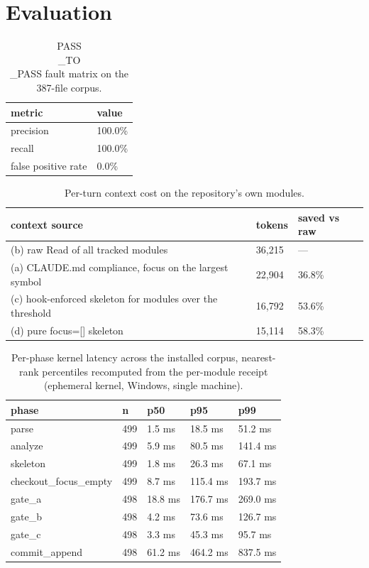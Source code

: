 \documentclass{article}
\begin{document}
\section{Evaluation}
\begin{table}[h]
\centering
\begin{tabular}{ll}
\toprule
metric & value \\
\midrule
precision & 100.0\% \\
recall & 100.0\% \\
false positive rate & 0.0\% \\
\bottomrule
\end{tabular}
\caption{PASS\\_TO\\_PASS fault matrix on the 387-file corpus.}
\label{tab:prf}
\end{table}
\begin{table}[h]
\centering
\begin{tabular}{lll}
\toprule
context source & tokens & saved vs raw \\
\midrule
(b) raw Read of all tracked modules & 36,215 & — \\
(a) CLAUDE.md compliance, focus on the largest symbol & 22,904 & 36.8\% \\
(c) hook-enforced skeleton for modules over the threshold & 16,792 & 53.6\% \\
(d) pure focus=[] skeleton & 15,114 & 58.3\% \\
\bottomrule
\end{tabular}
\caption{Per-turn context cost on the repository's own modules.}
\label{tab:tokens}
\end{table}
\begin{table}[h]
\centering
\begin{tabular}{lllll}
\toprule
phase & n & p50 & p95 & p99 \\
\midrule
parse & 499 & 1.5 ms & 18.5 ms & 51.2 ms \\
analyze & 499 & 5.9 ms & 80.5 ms & 141.4 ms \\
skeleton & 499 & 1.8 ms & 26.3 ms & 67.1 ms \\
checkout\_focus\_empty & 499 & 8.7 ms & 115.4 ms & 193.7 ms \\
gate\_a & 498 & 18.8 ms & 176.7 ms & 269.0 ms \\
gate\_b & 498 & 4.2 ms & 73.6 ms & 126.7 ms \\
gate\_c & 498 & 3.3 ms & 45.3 ms & 95.7 ms \\
commit\_append & 498 & 61.2 ms & 464.2 ms & 837.5 ms \\
\bottomrule
\end{tabular}
\caption{Per-phase kernel latency across the installed corpus, nearest-rank percentiles recomputed from the per-module receipt (ephemeral kernel, Windows, single machine).}
\label{tab:latency}
\end{table}
\end{document}
